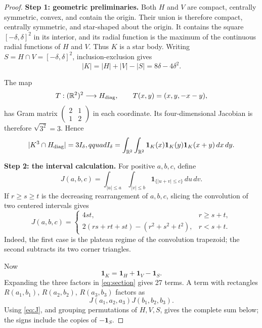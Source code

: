 \documentclass[11pt]{article}
\newcommand{\R}{\mathbb R}
\newcommand{\1}{\mathbf 1}
\begin{document}
\begin{proof}
\textbf{Step 1: geometric preliminaries.}
Both $H$ and $V$ are compact, centrally symmetric, convex, and contain the
origin.  Their union is therefore compact, centrally symmetric, and
star-shaped about the origin.  It contains the square
$[-\delta,\delta]^2$ in its interior, and its radial function is the maximum
of the continuous radial functions of $H$ and $V$.  Thus $K$ is a star body.
Writing $S=H\cap V=[-\delta,\delta]^2$, inclusion-exclusion gives
\begin{equation}\label{eq:area}
 |K|=|H|+|V|-|S|=8\delta-4\delta^2.
\end{equation}

The map
\[
 T:(\R^2)^2\longrightarrow H_{\rm diag},\qquad
 T(x,y)=(x,y,-x-y),
\]
has Gram matrix $\left(\begin{smallmatrix}2&1\\1&2\end{smallmatrix}\right)$ in each
coordinate.  Its four-dimensional Jacobian is therefore
$\sqrt{3^2}=3$.  Hence
\begin{equation}\label{eq:section}
 |K^3\cap H_{\rm diag}|=3I_\delta,qquad
 I_\delta=\int_{\R^2}\int_{\R^2}
 \1_K(x)\1_K(y)\1_K(x+y)\,dx\,dy.
\end{equation}

\textbf{Step 2: the interval calculation.}
For positive $a,b,c$, define
\[
 J(a,b,c)=\int_{|u|\le a}\int_{|v|\le b}
 \1_{\{|u+v|\le c\}}\,du\,dv.
\]
If $r\ge s\ge t$ is the decreasing rearrangement of $a,b,c$, slicing the
convolution of two centered intervals gives
\begin{equation}\label{eq:J}
 J(a,b,c)=
 \begin{cases}
 4st,&r\ge s+t,\\
 2(rs+rt+st)-(r^2+s^2+t^2),&r<s+t.
 \end{cases}
\end{equation}
Indeed, the first case is the plateau regime of the convolution trapezoid;
the second subtracts its two corner triangles.

Now
\[
 \1_K=\1_H+\1_V-\1_S.
\]
Expanding the three factors in \eqref{eq:section} gives 27 terms.  A term
with rectangles $R(a_1,b_1)$, $R(a_2,b_2)$, $R(a_3,b_3)$ factors as
\[
 J(a_1,a_2,a_3)J(b_1,b_2,b_3).
\]
Using \eqref{eq:J}, and grouping permutations of $H,V,S$, gives the complete
sum below; the signs include the copies of $-\1_S$.


\end{proof}
\end{document}
